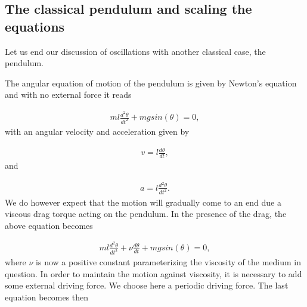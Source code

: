 \documentclass[letterpaper,10pt,english]{sphinxmanual}
\begin{document}
\subsection{The classical pendulum and scaling the equations}
\label{\detokenize{chapter4:the-classical-pendulum-and-scaling-the-equations}}
Let us end our discussion of oscillations with another classical case, the pendulum.

The angular equation of motion of the pendulum is given by
Newton’s equation and with no external force it reads




\begin{equation*}
\begin{split}
\begin{equation}
  ml\frac{d^2\theta}{dt^2}+mgsin(\theta)=0,
\label{_auto32} \tag{46}
\end{equation}
\end{split}
\end{equation*}
with an angular velocity and acceleration given by




\begin{equation*}
\begin{split}
\begin{equation}
     v=l\frac{d\theta}{dt},
\label{_auto33} \tag{47}
\end{equation}
\end{split}
\end{equation*}
and




\begin{equation*}
\begin{split}
\begin{equation}
     a=l\frac{d^2\theta}{dt^2}.
\label{_auto34} \tag{48}
\end{equation}
\end{split}
\end{equation*}
We do however expect that the motion will gradually come to an end due a viscous drag torque acting on the pendulum.
In the presence of the drag, the above equation becomes




\begin{equation*}
\begin{split}
\begin{equation}
   ml\frac{d^2\theta}{dt^2}+\nu\frac{d\theta}{dt}  +mgsin(\theta)=0, \label{eq:pend1} \tag{49}
\end{equation}
\end{split}
\end{equation*}
where \(\nu\) is now a positive constant parameterizing the viscosity
of the medium in question. In order to maintain the motion against
viscosity, it is necessary to add some external driving force.
We choose here a periodic driving force. The last equation becomes then
\end{document}
